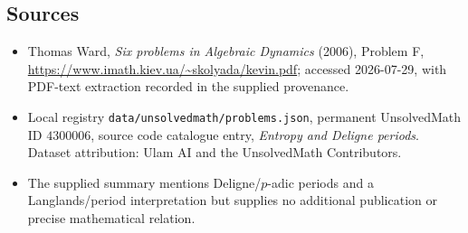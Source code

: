 \documentclass[11pt]{article}
\begin{document}
\subsection{Sources}
\begin{itemize}
\item Thomas Ward, \emph{Six problems in Algebraic Dynamics} (2006), Problem F, \url{https://www.imath.kiev.ua/~skolyada/kevin.pdf}; accessed 2026-07-29, with PDF-text extraction recorded in the supplied provenance.
\item Local registry \texttt{data/unsolvedmath/problems.json}, permanent UnsolvedMath ID $4300006$, source code catalogue entry, \emph{Entropy and Deligne periods}. Dataset attribution: Ulam AI and the UnsolvedMath Contributors.
\item The supplied summary mentions Deligne/$p$-adic periods and a Langlands/period interpretation but supplies no additional publication or precise mathematical relation.
\end{itemize}
\end{document}
